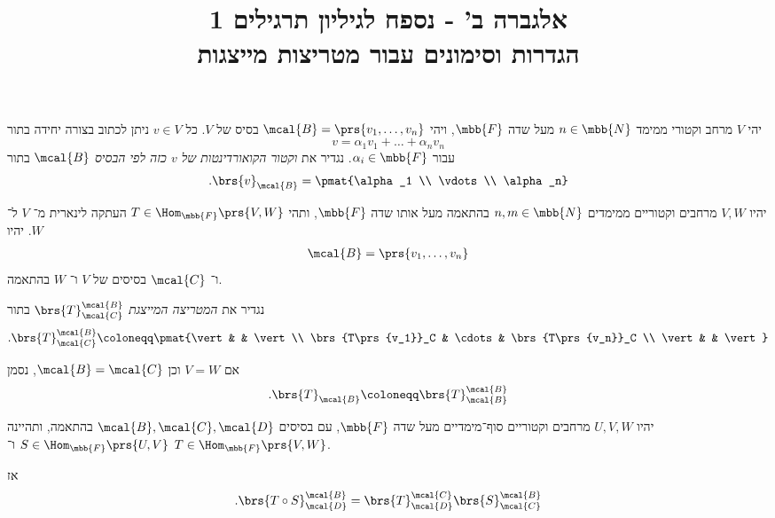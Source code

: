 \documentclass[a4paper,10pt,twoside,openany]{article}
\title{
אלגברה ב' - נספח לגיליון תרגילים 1 \\
הגדרות וסימונים עבור מטריצות מייצגות
}
\date{}
\begin{document}
\maketitle

\begin{definition}
יהי
$V$
מרחב וקטורי ממימד
$n \in \mbb{N}$
מעל שדה
$\mbb{F}$,
ויהי
$\mcal{B} = \prs{v_1, \ldots, v_n}$
בסיס של
$V$.
כל
$v \in V$
ניתן לכתוב בצורה יחידה בתור
\[v = \alpha_1 v_1 + \ldots + \alpha_n v_n\]
עבור
$\alpha_i \in \mbb{F}$.
נגדיר את
\emph{וקטור הקואורדינטות של
$v$
כזה לפי הבסיס
$\mcal{B}$}
בתור
\[\text{.} \brs{v}_{\mcal{B}} = \pmat{\alpha_1 \\ \vdots \\ \alpha_n}\]
\end{definition}

\begin{definition}
יהיו
$V,W$
מרחבים וקטוריים ממימדים
$n,m \in \mbb{N}$
בהתאמה מעל אותו שדה
$\mbb{F}$,
ותהי
$T \in \Hom_{\mbb{F}}\prs{V,W}$
העתקה לינארית מ־%
$V$
ל־%
$W$.
יהיו
\begin{align*}
\mcal{B} = \prs{v_1, \ldots, v_n}
\end{align*}
ו־%
$\mcal{C}$
בסיסים של
$V$
ו־%
$W$
בהתאמה.

נגדיר את
\emph{המטריצה המייצגת}
$\brs{T}^\mcal{B}_\mcal{C}$
בתור
\begin{align*}
\text{.} \brs{T}^\mcal{B}_\mcal{C} \coloneqq \pmat{\vert & & \vert \\ \brs{T\prs{v_1}}_C & \cdots & \brs{T\prs{v_n}}_C \\ \vert & & \vert}
\end{align*}

אם
$V = W$
וכן
$\mcal{B} = \mcal{C}$,
נסמן
\begin{align*}
\text{.} \brs{T}_\mcal{B} \coloneqq \brs{T}^{\mcal{B}}_{\mcal{B}}
\end{align*}
\end{definition}

\begin{proposition} \label{proposition:matrix-of-composition}
יהיו
$U,V,W$
מרחבים וקטוריים סוף־מימדיים מעל שדה
$\mbb{F}$,
עם בסיסים
$\mcal{B}, \mcal{C}, \mcal{D}$
בהתאמה,
ותהיינה
$S \in \Hom_{\mbb{F}}\prs{U,V}$
ו־%
$T \in \Hom_{\mbb{F}}\prs{V,W}$.

אז
\begin{align*}
\text{.} \brs{T \circ S}^\mcal{B}_\mcal{D} = \brs{T}^\mcal{C}_\mcal{D} \brs{S}^\mcal{B}_\mcal{C}
\end{align*}
\end{proposition}
\end{document}
